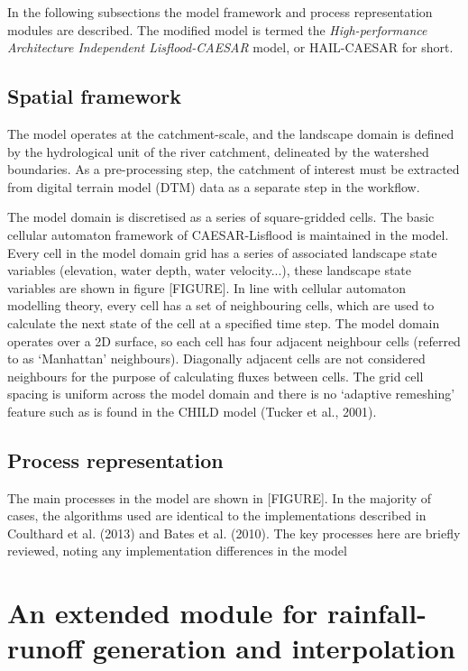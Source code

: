 \documentclass[12pt,oneside,PhD]{muthesis}
\begin{document}
In the following subsections the model framework and process representation modules are described. The modified model is termed the \textit{High-performance Architecture Independent Lisflood-CAESAR} model, or HAIL-CAESAR for short. 


\subsection{Spatial framework}
The model operates at the catchment-scale, and the landscape domain is defined by the hydrological unit of the river catchment, delineated by the watershed boundaries. As a pre-processing step, the catchment of interest must be extracted from digital terrain model (DTM) data as a separate step in the workflow. 

The model domain is discretised as a series of square-gridded cells. The basic cellular automaton framework of CAESAR-Lisflood is maintained in the model.  Every cell in the model domain grid has a series of associated landscape state variables (elevation, water depth, water velocity...), these landscape state variables are shown in figure [FIGURE]. In line with cellular automaton modelling theory, every cell has a set of neighbouring cells, which are used to calculate the next state of the cell at a specified time step. The model domain operates over a 2D surface, so each cell has four adjacent neighbour cells (referred to as `Manhattan' neighbours). Diagonally adjacent cells are not considered neighbours for the purpose of calculating fluxes between cells. The grid cell spacing is uniform across the model domain and there is no `adaptive remeshing' feature such as is found in the CHILD model (Tucker et al., 2001). 

\subsection{Process representation}

The main processes in the model are shown in [FIGURE]. In the majority of cases, the algorithms used are identical to the implementations described in Coulthard et al. (2013) and Bates et al. (2010). The key processes here are briefly reviewed, noting any implementation differences in the model




\section{An extended module for rainfall-runoff generation and interpolation}
\end{document}
